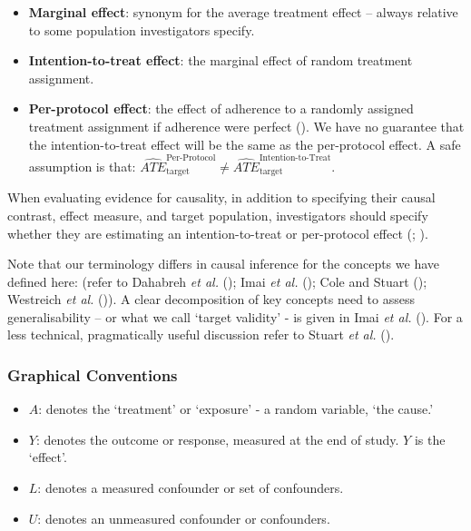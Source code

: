\documentclass[
  single column]{article}
\begin{document}
\begin{itemize}
\item
  \textbf{Marginal effect}: synonym for the average treatment effect --
  always relative to some population investigators specify.
\item
  \textbf{Intention-to-treat effect}: the marginal effect of random
  treatment assignment.
\item
  \textbf{Per-protocol effect}: the effect of adherence to a randomly
  assigned treatment assignment if adherence were perfect
  (). We have no
  guarantee that the intention-to-treat effect will be the same as the
  per-protocol effect. A safe assumption is that:
  \(\widehat{ATE}_{\text{target}}^{\text{Per-Protocol}} \ne \widehat{ATE}_{\text{target}}^{\text{Intention-to-Treat}}\).
\end{itemize}

When evaluating evidence for causality, in addition to specifying their
causal contrast, effect measure, and target population, investigators
should specify whether they are estimating an intention-to-treat or
per-protocol effect (;
).

Note that our terminology differs in causal inference for the concepts
we have defined here: (refer to Dahabreh \emph{et al.}
(); Imai \emph{et al.}
(); Cole and Stuart
(); Westreich \emph{et al.}
()). A clear
decomposition of key concepts need to assess generalisability -- or what
we call `target validity' - is given in Imai \emph{et al.}
(). For a less technical,
pragmatically useful discussion refer to Stuart \emph{et al.}
().

\subsubsection{Graphical Conventions}\label{graphical-conventions}

\begin{itemize}
\item
  \textbf{\(A\)}: denotes the `treatment' or `exposure' - a random
  variable, `the cause.'
\item
  \textbf{\(Y\)}: denotes the outcome or response, measured at the end
  of study. \(Y\) is the `effect'.
\item
  \textbf{\(L\)}: denotes a measured confounder or set of confounders.
\item
  \textbf{\(U\)}: denotes an unmeasured confounder or confounders.
\end{itemize}
\end{document}
